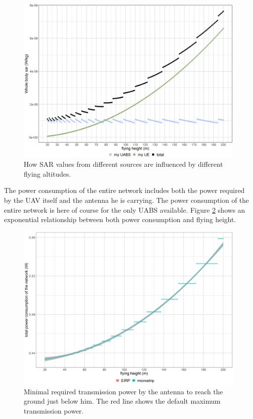 \begin{figure}[]
  \includegraphics[width=\textwidth]{../results/s1/fhvssar.png}
  \caption{How SAR values from different sources are influenced by different flying altitudes.}
  \label{fig:s1_fhsar}
\end{figure}

The power consumption of the entire network includes both the power required by the \gls{UAV} itself and the antenna he is carrying.
The power consumption of the entire network is here of course for the only \gls{UABS} available. Figure \ref{fig:fhvspc} shows an 
exponential relationship between both power consumption and flying height. 

\begin{figure}[t]
  \centering
  \includegraphics[width=\textwidth]{../results/s1/fhvspc.png}
  \caption{Minimal required transmission power by the antenna to reach the ground just below him. The red line shows the default maximum transmission power.}
  \label{fig:fhvspc}
\end{figure}

